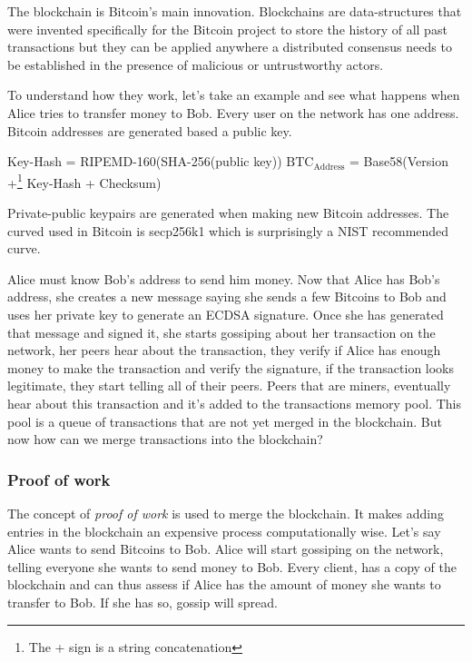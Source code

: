 \documentclass{vldb}
\begin{document}
The blockchain is Bitcoin's main innovation. Blockchains are data-structures that were invented specifically for the Bitcoin project to store the history of all past transactions but they can be applied anywhere a distributed consensus needs to be established in the presence of malicious or untrustworthy actors.

To understand how they work, let's take an example and see what happens when Alice tries to transfer money to Bob. Every user on the network has one address. Bitcoin addresses are generated based a public key. 
\begin{center}
Key-Hash = RIPEMD-160(SHA-256(public key))
$\text{BTC}_{\text{Address}}$ = Base58(Version +\footnote{The + sign is a string concatenation} Key-Hash + Checksum)
\end{center}

Private-public keypairs are generated when making new Bitcoin addresses. The curved used in Bitcoin is secp256k1 which is surprisingly a NIST recommended curve.\cite{VOID}

Alice must know Bob's address to send him money. Now that Alice has Bob's address, she creates a new message saying she sends a few Bitcoins to Bob and uses her private key to generate an ECDSA signature. Once she has generated that message and signed it, she starts gossiping about her transaction on the network, her peers hear about the transaction, they verify if Alice has enough money to make the transaction and verify the signature, if the transaction looks legitimate, they start telling all of their peers. Peers that are miners, eventually hear about this transaction and it's added to the transactions memory pool. This pool is a queue of transactions that are not yet merged in the blockchain. But now how can we merge transactions into the blockchain? 

\subsubsection{Proof of work}

The concept of \emph{proof of work} is used to merge the blockchain. It makes adding entries in the blockchain an expensive process computationally wise. Let's say Alice wants to send Bitcoins to Bob. Alice will start gossiping on the network, telling everyone she wants to send money to Bob. Every client, has a copy of the blockchain and can thus assess if Alice has the amount of money she wants to transfer to Bob. If she has so, gossip will spread. 
\end{document}
